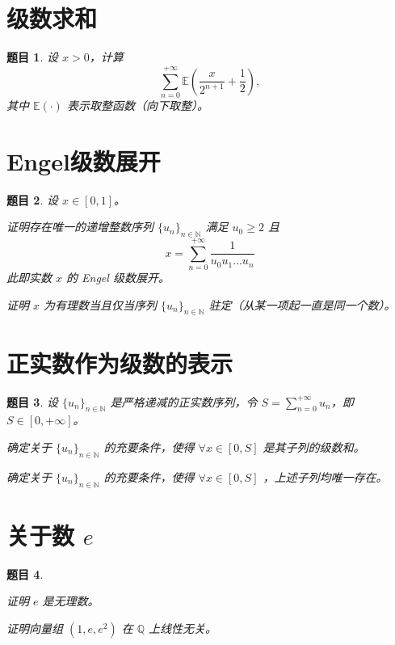 \documentclass[12pt,UTF8,fontset=none]{ctexbook}
\theoremstyle{exercisestyle}
\newtheorem*{exercise}{题目}
\theoremstyle{solutionstyle}
\begin{document}
\section{级数求和}\label{calcul-dune-somme}
\begin{exercise}
设 $x > 0$，计算  
$$
\sum_{n=0}^{+\infty} \mathbb{E}\left(\frac{x}{2^{n+1}} + \frac{1}{2}\right),
$$  
其中 $\mathbb{E}(\cdot)$ 表示取整函数（向下取整）。
\end{exercise}

\section{Engel级数展开}
\begin{exercise}
设 $x \in [0,1]$。  
\begin{subquestions}
  \item 证明存在唯一的递增整数序列 $\{u_n\}_{n\in\mathbb{N}}$ 满足 $u_0 \geqslant 2$ 且  
  $$
  x = \sum_{n=0}^{+\infty} \frac{1}{u_0 u_1 \dots u_n}
  $$
  此即实数 $x$ 的 Engel 级数展开。  
  \item 证明 $x$ 为有理数当且仅当序列 $\{u_n\}_{n\in\mathbb{N}}$ 驻定（从某一项起一直是同一个数）。
\end{subquestions}
\end{exercise}

\section{正实数作为级数的表示}
\begin{exercise}
设 $\{u_n\}_{n\in\mathbb{N}}$ 是严格递减的正实数序列，令 $\displaystyle S = \sum_{n=0}^{+\infty} u_n$，即 $S \in [0, +\infty]$。

\begin{subquestions}
\item 确定关于 $\{u_n\}_{n\in\mathbb{N}}$ 的充要条件，使得 $\forall x \in [0, S]$ 是其子列的级数和。
\item 确定关于 $\{u_n\}_{n\in\mathbb{N}}$ 的充要条件，使得 $\forall x \in [0, S]$ ，上述子列均唯一存在。
\end{subquestions}

\end{exercise}

\section{关于数 $e$}
\begin{exercise}
  \begin{subquestions}
    \item 证明 $e$ 是无理数。
    \item 证明向量组 $(1, e, e^2)$ 在 $\mathbb{Q}$ 上线性无关。
  \end{subquestions}
\end{exercise}
\end{document}
